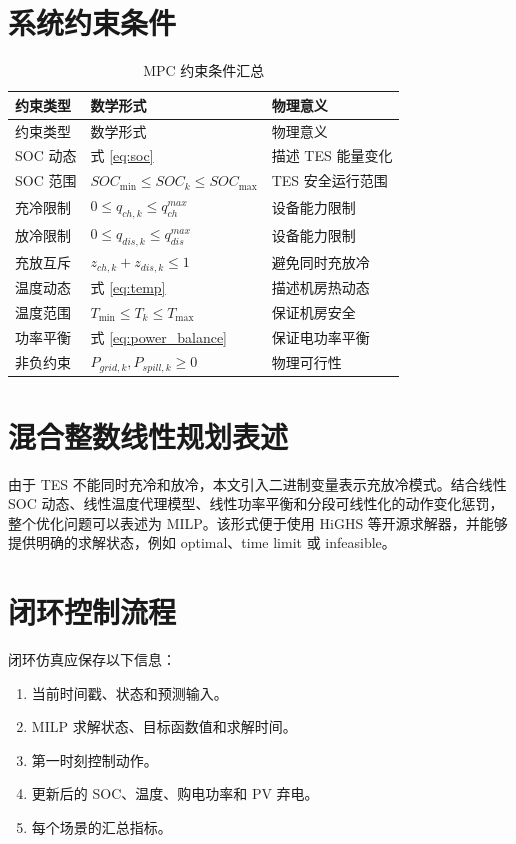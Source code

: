 \documentclass[UTF8,a4paper,12pt]{ctexrep}
\begin{document}
\section{系统约束条件}

\begin{longtable}{lll}
  \caption{MPC 约束条件汇总} \\
  \toprule
  约束类型 & 数学形式 & 物理意义 \\
  \midrule
  \endfirsthead
  \toprule
  约束类型 & 数学形式 & 物理意义 \\
  \midrule
  \endhead
  SOC 动态 & 式 \eqref{eq:soc} & 描述 TES 能量变化 \\
  SOC 范围 & $SOC_{\min}\leq SOC_k\leq SOC_{\max}$ & TES 安全运行范围 \\
  充冷限制 & $0\leq q_{ch,k}\leq q_{ch}^{max}$ & 设备能力限制 \\
  放冷限制 & $0\leq q_{dis,k}\leq q_{dis}^{max}$ & 设备能力限制 \\
  充放互斥 & $z_{ch,k}+z_{dis,k}\leq 1$ & 避免同时充放冷 \\
  温度动态 & 式 \eqref{eq:temp} & 描述机房热动态 \\
  温度范围 & $T_{\min}\leq T_k\leq T_{\max}$ & 保证机房安全 \\
  功率平衡 & 式 \eqref{eq:power_balance} & 保证电功率平衡 \\
  非负约束 & $P_{grid,k},P_{spill,k}\geq 0$ & 物理可行性 \\
  \bottomrule
\end{longtable}

\section{混合整数线性规划表述}

由于 TES 不能同时充冷和放冷，本文引入二进制变量表示充放冷模式。结合线性 SOC 动态、线性温度代理模型、线性功率平衡和分段可线性化的动作变化惩罚，整个优化问题可以表述为 MILP。该形式便于使用 HiGHS 等开源求解器，并能够提供明确的求解状态，例如 optimal、time limit 或 infeasible。

\section{闭环控制流程}

闭环仿真应保存以下信息：

\begin{enumerate}[label=(\arabic*)]
  \item 当前时间戳、状态和预测输入。
  \item MILP 求解状态、目标函数值和求解时间。
  \item 第一时刻控制动作。
  \item 更新后的 SOC、温度、购电功率和 PV 弃电。
  \item 每个场景的汇总指标。
\end{enumerate}
\end{document}
